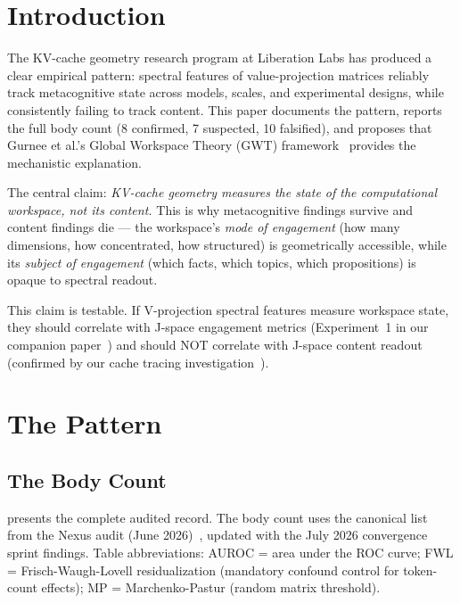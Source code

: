 \documentclass[11pt,a4paper]{article}
\begin{document}
\section{Introduction}
\label{sec:intro}

The KV-cache geometry research program at Liberation Labs has produced
a clear empirical pattern: spectral features of value-projection
matrices reliably track metacognitive state across models, scales, and
experimental designs, while consistently failing to track content. This
paper documents the pattern, reports the full body count (8 confirmed,
7 suspected, 10 falsified), and proposes that Gurnee et al.'s Global
Workspace Theory (GWT) framework~\citep{gurnee2026gwt} provides the
mechanistic explanation.

The central claim: \emph{KV-cache geometry measures the state of the
computational workspace, not its content.} This is why metacognitive
findings survive and content findings die --- the workspace's
\emph{mode of engagement} (how many dimensions, how concentrated, how
structured) is geometrically accessible, while its \emph{subject of
engagement} (which facts, which topics, which propositions) is opaque
to spectral readout.

This claim is testable. If V-projection spectral features measure
workspace state, they should correlate with J-space engagement metrics
(Experiment~1 in our companion paper~\citep{lyra2026gwt_response}) and
should NOT correlate with J-space content readout (confirmed by our
cache tracing investigation~\citep{lyra2026cache_tracing}).

\section{The Pattern}
\label{sec:pattern}

\subsection{The Body Count}

 presents the complete audited record. The
body count uses the canonical list from the Nexus audit (June
2026)~\citep{lyra2026nexus_audit}, updated with the July 2026
convergence sprint findings. Table abbreviations: AUROC = area under
the ROC curve; FWL = Frisch-Waugh-Lovell residualization (mandatory
confound control for token-count effects);
MP = Marchenko-Pastur (random matrix threshold).
\end{document}

